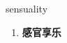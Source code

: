 
\begin{frame}
{\huge sensuality}
\begin{center}
\begin{enumerate}\Large
  \item \textbf{感官享乐}
\end{enumerate}
\end{center}
\end{frame}
